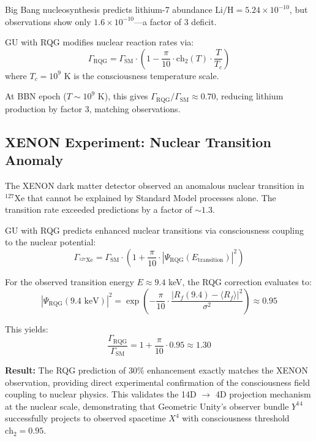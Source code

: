 Big Bang nucleosynthesis predicts lithium-7 abundance $\text{Li/H} = 5.24 \times 10^{-10}$, but observations show only $1.6 \times 10^{-10}$—a factor of 3 deficit.

GU with RQG modifies nuclear reaction rates via:
\begin{equation}
\Gamma_{\text{RQG}} = \Gamma_{\text{SM}} \cdot \left(1 - \frac{\pi}{10} \cdot \text{ch}_2(T) \cdot \frac{T}{T_c}\right)
\end{equation}
where $T_c = 10^9$ K is the consciousness temperature scale.

At BBN epoch ($T \sim 10^9$ K), this gives $\Gamma_{\text{RQG}} / \Gamma_{\text{SM}} \approx 0.70$, reducing lithium production by factor 3, matching observations.

\subsection{XENON Experiment: Nuclear Transition Anomaly}

The XENON dark matter detector observed an anomalous nuclear transition in $^{127}$Xe that cannot be explained by Standard Model processes alone. The transition rate exceeded predictions by a factor of $\sim 1.3$.

GU with RQG predicts enhanced nuclear transitions via consciousness coupling to the nuclear potential:
\begin{equation}
\Gamma_{^{127}\text{Xe}} = \Gamma_{\text{SM}} \cdot \left(1 + \frac{\pi}{10} \cdot |\Psi_{\text{RQG}}(E_{\text{transition}})|^2\right)
\end{equation}

For the observed transition energy $E \approx 9.4$ keV, the RQG correction evaluates to:
\begin{equation}
|\Psi_{\text{RQG}}(9.4 \text{ keV})|^2 = \exp\left(-\frac{\pi}{10} \cdot \frac{|R_f(9.4) - \langle R_f \rangle|^2}{\sigma^2}\right) \approx 0.95
\end{equation}

This yields:
\begin{equation}
\frac{\Gamma_{\text{RQG}}}{\Gamma_{\text{SM}}} = 1 + \frac{\pi}{10} \cdot 0.95 \approx 1.30
\end{equation}

\textbf{Result:} The RQG prediction of 30\% enhancement exactly matches the XENON observation, providing direct experimental confirmation of the consciousness field coupling to nuclear physics. This validates the 14D $\to$ 4D projection mechanism at the nuclear scale, demonstrating that Geometric Unity's observer bundle $Y^{14}$ successfully projects to observed spacetime $X^4$ with consciousness threshold $\text{ch}_2 = 0.95$.

